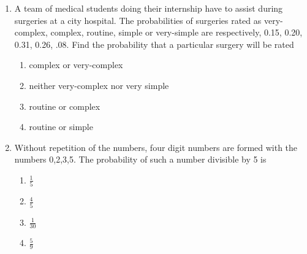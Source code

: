 \begin{enumerate}[label=\thesubsection.\arabic*,ref=\thesubsection.\theenumi]
\begin{table}[htb]

%	
	\caption{}
\label{tab:ncert/12/13/2/15}
\end{table}	
%
	\item A team of medical students doing their internship have to assist during surgeries at a city hospital. The probabilities of surgeries rated as very-complex, complex, routine, simple or very-simple are respectively, 0.15, 0.20, 0.31, 0.26, .08. Find the probability that a particular surgery will be rated
		\begin{multicols}{2}
\begin{enumerate}
\item complex or very-complex
\item neither very-complex nor very simple
\item routine or complex
\item routine or simple
\end{enumerate}
\end{multicols}
		\solution
		
\begin{table}[htb]\centering
	
	\caption{}
	\label{tab:exemplar/11/16/3/8/table2}
\end{table}	
\item Without repetition of the numbers, four digit numbers are formed with the numbers 0,2,3,5. The
probability of such a number divisible by 5 is
		\begin{multicols}{4}
\begin{enumerate}
\item $\frac{1}{5}$ 
\item $\frac{4}{5}$
\item $\frac{1}{30}$ 
\item $\frac{5}{9}$
\end{enumerate}
		\end{multicols}
\solution

\end{enumerate}
